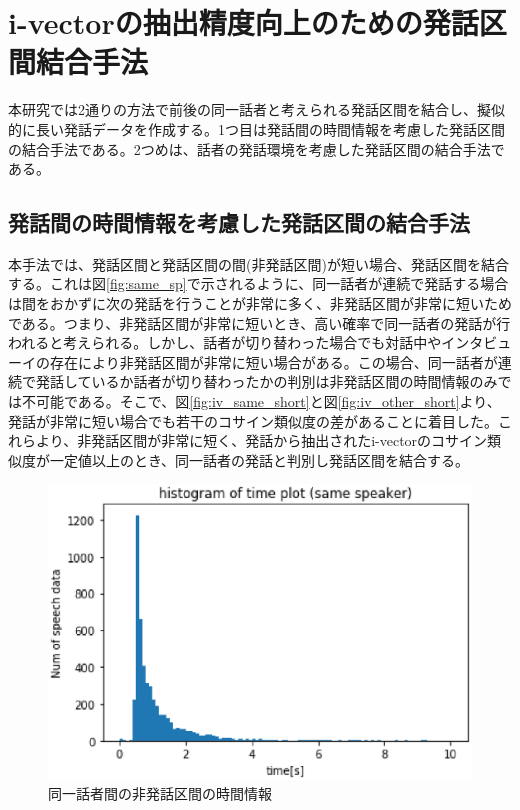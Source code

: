 \chapter{i-vectorの抽出精度向上のための発話区間結合手法}
\label{chapter:prob_method}
本研究では2通りの方法で前後の同一話者と考えられる発話区間を結合し、擬似的に長い発話データを作成する。1つ目は発話間の時間情報を考慮した発話区間の結合手法である。2つめは、話者の発話環境を考慮した発話区間の結合手法である。

\section{発話間の時間情報を考慮した発話区間の結合手法}
本手法では、発話区間と発話区間の間(非発話区間)が短い場合、発話区間を結合する。これは図\ref{fig:same_sp}で示されるように、同一話者が連続で発話する場合は間をおかずに次の発話を行うことが非常に多く、非発話区間が非常に短いためである。つまり、非発話区間が非常に短いとき、高い確率で同一話者の発話が行われると考えられる。しかし、話者が切り替わった場合でも対話中やインタビューイの存在により非発話区間が非常に短い場合がある。この場合、同一話者が連続で発話しているか話者が切り替わったかの判別は非発話区間の時間情報のみでは不可能である。そこで、図\ref{fig:iv_same_short}と図\ref{fig:iv_other_short}より、発話が非常に短い場合でも若干のコサイン類似度の差があることに着目した。これらより、非発話区間が非常に短く、発話から抽出されたi-vectorのコサイン類似度が一定値以上のとき、同一話者の発話と判別し発話区間を結合する。

\begin{figure}[htb]
  \begin{center}
    \includegraphics{./figure/same_sp.eps}
  \end{center}
  \caption{同一話者間の非発話区間の時間情報 \label{fig:flow_prob1}}
\end{figure}

